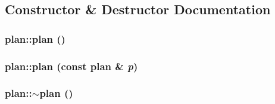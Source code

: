 \subsection{Constructor \& Destructor Documentation}
\hypertarget{classplan_a266f45990dd94064d40cb8e5722120e6}{
\subsubsection[{plan}]{\setlength{\rightskip}{0pt plus 5cm}plan::plan ()}}
\label{classplan_a266f45990dd94064d40cb8e5722120e6}
\hypertarget{classplan_a74c8e47a3643fc7cc2613d8ad9a05dbb}{
\subsubsection[{plan}]{\setlength{\rightskip}{0pt plus 5cm}plan::plan (const {\bf plan} \& {\em p})}}
\label{classplan_a74c8e47a3643fc7cc2613d8ad9a05dbb}
\hypertarget{classplan_ab23766d95b648190c091e88baa118076}{
\subsubsection[{$\sim$plan}]{\setlength{\rightskip}{0pt plus 5cm}plan::$\sim$plan ()}}
\label{classplan_ab23766d95b648190c091e88baa118076}


